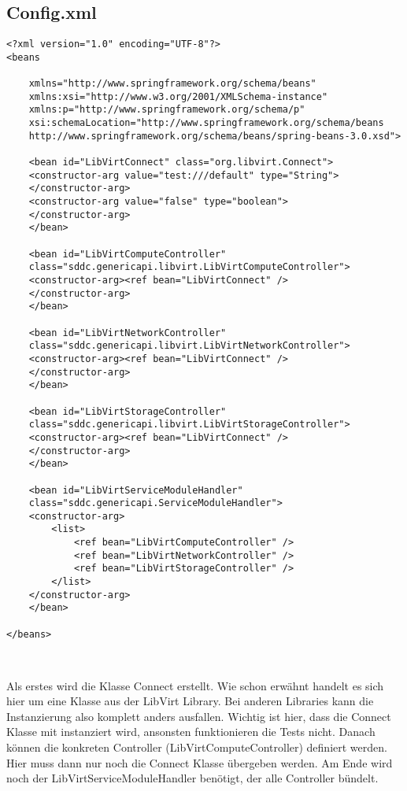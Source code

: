 \subsection{Config.xml}
\begin{lstlisting}[style=XML,frame=single]
<?xml version="1.0" encoding="UTF-8"?>  
<beans  

    xmlns="http://www.springframework.org/schema/beans"  
    xmlns:xsi="http://www.w3.org/2001/XMLSchema-instance"  
    xmlns:p="http://www.springframework.org/schema/p"  
    xsi:schemaLocation="http://www.springframework.org/schema/beans  
    http://www.springframework.org/schema/beans/spring-beans-3.0.xsd">

	<bean id="LibVirtConnect" class="org.libvirt.Connect">
	<constructor-arg value="test:///default" type="String">
	</constructor-arg>
	<constructor-arg value="false" type="boolean">
	</constructor-arg>
	</bean>

	<bean id="LibVirtComputeController" 
	class="sddc.genericapi.libvirt.LibVirtComputeController">
	<constructor-arg><ref bean="LibVirtConnect" />
	</constructor-arg>
	</bean>
	
	<bean id="LibVirtNetworkController" 
	class="sddc.genericapi.libvirt.LibVirtNetworkController">
	<constructor-arg><ref bean="LibVirtConnect" />
	</constructor-arg>
	</bean>
	
	<bean id="LibVirtStorageController" 
	class="sddc.genericapi.libvirt.LibVirtStorageController">
	<constructor-arg><ref bean="LibVirtConnect" />
	</constructor-arg>
	</bean>
	
	<bean id="LibVirtServiceModuleHandler" 
	class="sddc.genericapi.ServiceModuleHandler">
	<constructor-arg>
		<list>
			<ref bean="LibVirtComputeController" />
			<ref bean="LibVirtNetworkController" />
			<ref bean="LibVirtStorageController" />
		</list>
	</constructor-arg>
	</bean>
	             
</beans>



\end{lstlisting}
Als erstes wird die Klasse Connect erstellt. Wie schon erwähnt handelt es sich hier 
um eine Klasse aus der LibVirt Library. Bei anderen Libraries kann die Instanzierung 
also komplett anders ausfallen. Wichtig ist hier, dass die Connect Klasse mit 
instanziert wird, ansonsten funktionieren die Tests nicht. Danach können die konkreten 
Controller (LibVirtComputeController) definiert werden. Hier muss dann nur noch die Connect 
Klasse übergeben werden. Am Ende wird noch der LibVirtServiceModuleHandler benötigt, 
der alle Controller bündelt.\\
